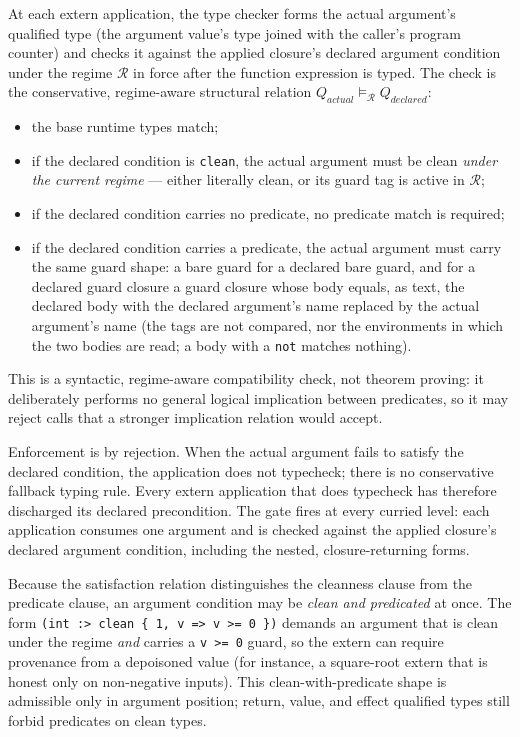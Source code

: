 \documentclass[12pt]{article}
\begin{document}
At each extern application, the type checker forms the actual argument's
qualified type (the argument value's type joined with the caller's program
counter) and checks it against the applied closure's declared argument condition
under the regime \(\mathcal{R}\) in force after the function expression is typed.
The check is the conservative, regime-aware structural relation
\(Q_{\mathit{actual}} \vDash_{\mathcal{R}} Q_{\mathit{declared}}\):
\begin{itemize}
    \item the base runtime types match;
    \item if the declared condition is \texttt{clean}, the actual argument must
      be clean \emph{under the current regime} --- either literally clean, or its
      guard tag is active in \(\mathcal{R}\);
    \item if the declared condition carries no predicate, no predicate match is
      required;
    \item if the declared condition carries a predicate, the actual argument must
      carry the same guard shape: a bare guard for a declared bare guard, and
      for a declared guard closure a guard closure whose body equals, as text,
      the declared body with the declared argument's name replaced by the
      actual argument's name (the tags are not compared, nor the environments
      in which the two bodies are read; a body with a \texttt{not} matches
      nothing).
\end{itemize}
This is a syntactic, regime-aware compatibility check, not theorem proving: it
deliberately performs no general logical implication between predicates, so it
may reject calls that a stronger implication relation would accept.

Enforcement is by rejection. When the actual argument fails to satisfy the
declared condition, the application does not typecheck; there is no conservative
fallback typing rule. Every extern application that does typecheck has therefore
discharged its declared precondition. The gate fires at every curried level: each
application consumes one argument and is checked against the applied closure's
declared argument condition, including the nested, closure-returning forms.

Because the satisfaction relation distinguishes the cleanness clause from the
predicate clause, an argument condition may be \emph{clean and predicated} at
once. The form \texttt{(int :> clean \{ 1, v => v >= 0 \})} demands an argument
that is clean under the regime \emph{and} carries a \texttt{v >= 0} guard, so the
extern can require provenance from a depoisoned value (for instance, a square-root
extern that is honest only on non-negative inputs). This clean-with-predicate
shape is admissible only in argument position; return, value, and effect
qualified types still forbid predicates on clean types.
\end{document}
